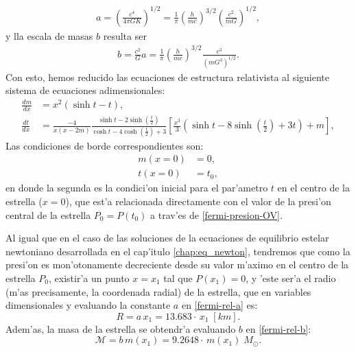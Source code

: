 \begin{align}\label{fermi-rel-a}
 a=\left(\frac{c^4}{4\pi G K}\right)^{1/2}=\frac{1}{\pi}\left(\frac{h}{mc}\right)^{3/2}\left(\frac{c^2}{mG}\right)^{1/2},
\end{align}
y lla escala de masas $b$ resulta ser
\begin{align}\label{fermi-rel-b}
 b=\frac{c^2}{G}a=\frac{1}{\pi}\left(\frac{h}{mc}\right)^{3/2}\frac{c^3}{(mG^3)^{1/2}}.
\end{align}
Con esto, hemos reducido las ecuaciones de estructura relativista al siguiente sistema de ecuaciones adimensionales:
\begin{equation}\label{fermi-rel-sistema}
\boxed{
\begin{aligned}
\frac{dm}{dx}&=x^2(\sinh t-t),\\
\frac{dt}{dx}&=\frac{-4}{x(x-2m)}\frac{\sinh t-2\sinh\left(\frac{t}{2}\right)}{\cosh t-4\cosh \left(\frac{t}{2}\right)+3}\left[ \frac{x^3}{3}\left(\sinh t-8\sinh \left(\frac{t}{2}\right)+3t\right)+m\right],
\end{aligned}}
\end{equation}
Las condiciones de borde correspondientes son:
\begin{align}
 m(x=0)&=0,\\
t(x=0)&=t_0,
\end{align}
en donde la segunda es la condici'on inicial para el par'ametro $t$ en el centro de la estrella ($x=0$), que est'a relacionada directamente con el valor de la presi'on central de la estrella $P_0=P(t_0)$ a trav'es de \eqref{fermi-presion-OV}.

Al igual que en el caso de las soluciones de la ecuaciones de equilibrio estelar newtoniano desarrollada en el cap'itulo \ref{chap:eq_newton}, tendremos que como la presi'on es mon'otonamente decreciente desde su valor m'aximo en el centro de la estrella $P_0$, existir'a un punto $x=x_1$ tal que $P(x_1)=0$, y 'este ser'a el radio (m'as precisamente, la coordenada radial) de la estrella, que en variables dimensionales y evaluando la constante $a$ en \eqref{fermi-rel-a} es:
\begin{equation}\label{fermi-rel-radio}
 R=a\, x_1
= 13.683\cdot\,x_1\;[km].
\end{equation}
Adem'as, la masa de la estrella se obtendr'a evaluando $b$ en \eqref{fermi-rel-b}:
\begin{equation}\label{fermi-rel-masa}
\mathcal{M}=b\,m(x_1)=9.2648\cdot\,m(x_1)\;M_{\odot}.
\end{equation}

